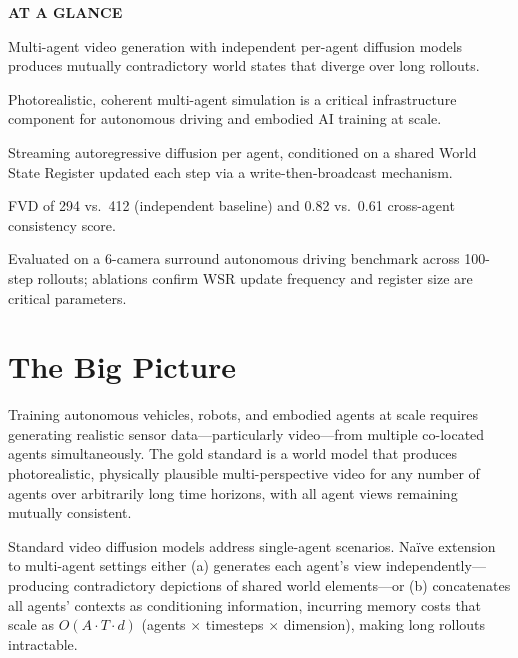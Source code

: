 \documentclass[10pt,twocolumn]{article}
\begin{document}
\begin{mdframed}[backgroundcolor=boxgray,linecolor=rulered,linewidth=1pt,
    innerleftmargin=6pt,innerrightmargin=6pt,
    innertopmargin=6pt,innerbottommargin=6pt]
\textbf{\small AT A GLANCE}\par\vspace{4pt}
\begin{description}[leftmargin=0pt,labelsep=4pt,itemsep=2pt,parsep=0pt,
    font=\small\bfseries]
  \item[Problem:] Multi-agent video generation with independent per-agent
    diffusion models produces mutually contradictory world states that
    diverge over long rollouts.
  \item[Why it matters:] Photorealistic, coherent multi-agent simulation
    is a critical infrastructure component for autonomous driving
    and embodied AI training at scale.
  \item[Method:] Streaming autoregressive diffusion per agent,
    conditioned on a shared World State Register updated each step
    via a write-then-broadcast mechanism.
  \item[Result:] FVD of 294 vs.\ 412 (independent baseline) and
    0.82 vs.\ 0.61 cross-agent consistency score.
  \item[Evidence:] Evaluated on a 6-camera surround autonomous driving
    benchmark across 100-step rollouts; ablations confirm WSR update
    frequency and register size are critical parameters.
\end{description}
\end{mdframed}

\section{The Big Picture}

Training autonomous vehicles, robots, and embodied agents at scale
requires generating realistic sensor data---particularly video---from
multiple co-located agents simultaneously. The gold standard is
a world model that produces photorealistic, physically plausible
multi-perspective video for any number of agents over arbitrarily
long time horizons, with all agent views remaining mutually consistent.

Standard video diffusion models address single-agent scenarios.
Na\"ive extension to multi-agent settings either (a) generates each
agent's view independently---producing contradictory depictions of
shared world elements---or (b) concatenates all agents' contexts
as conditioning information, incurring memory costs that scale as
$O(A \cdot T \cdot d)$ (agents $\times$ timesteps $\times$ dimension),
making long rollouts intractable.
\end{document}

